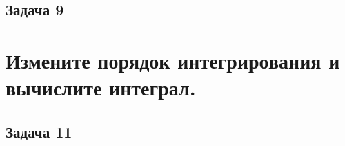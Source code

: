 \documentclass[a4paper, fleqn]{article}
\begin{document}
    
    \subsection*{Задача 9}
    
    
    \section*{Измените порядок интегрирования и вычислите интеграл.}
    
    \subsection*{Задача 11}
    
    
    
    
    
    
    
\end{document}
